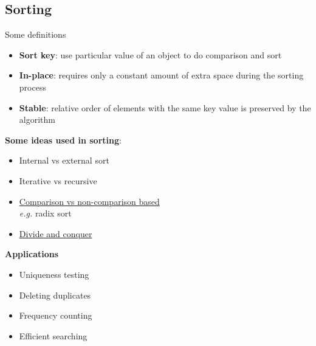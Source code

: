 \documentclass{article}
\newcommand{\eg}[0]{\textit{e.g. }}
\begin{document}
\begin{multicols}{2}
\section{Sorting}
Some definitions
\begin{itemize}
	\item \textbf{Sort key}: use particular value of an object to do comparison and sort
	\item \textbf{In-place}: requires only a constant amount of extra space during the sorting process
	\item \textbf{Stable}: relative order of elements with the same key value is preserved by the algorithm
\end{itemize}
\textbf{Some ideas used in sorting}:
\begin{itemize}
	\item Internal vs external sort
	\item Iterative vs recursive
	\item \underline{Comparison vs non-comparison based}\\
	\eg radix sort
	\item \underline{Divide and conquer}
\end{itemize}
\textbf{Applications}
\begin{itemize}
	\item Uniqueness testing
	\item Deleting duplicates
	\item Frequency counting
	\item Efficient searching
\end{itemize}
\begin{table}[H]
\end{table}

\end{multicols}
\end{document}
